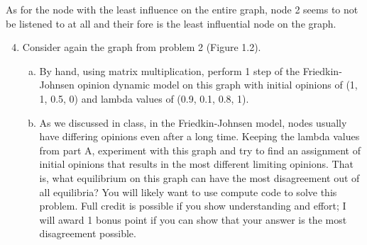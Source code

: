 \documentclass[11pt]{article}
\begin{document}
{\begin{enumerate}
\begin{enumerate}[(a)]
 As for the node with the least influence on the entire graph, node 2 seems to not be listened to at all and their fore is the least influential node on the graph. 
	\end{enumerate}	
\end{enumerate}
}

\begin{enumerate}
	\setcounter{enumi}{3}
	\item Consider again the graph from problem 2 (Figure 1.2).
	\begin{enumerate}[(a)]
		\item By hand, using matrix multiplication, perform 1 step of the Friedkin-Johnsen opinion dynamic model on this graph with initial opinions of (1, 1, 0.5, 0) and lambda values of (0.9, 0.1, 0.8, 1).
		\item As we discussed in class, in the Friedkin-Johnsen model, nodes usually have differing opinions even after a long time. Keeping the lambda values from part A, experiment with this graph and try to find an assignment of initial opinions that results in the most different limiting opinions. That is, what equilibrium on this graph can have the most disagreement out of all equilibria? You will likely want to use compute code to solve this problem. Full credit is possible if you show understanding and effort; I will award 1 bonus point if you can show that your answer is the most disagreement possible.
	\end{enumerate}
\end{enumerate}
\end{document}
